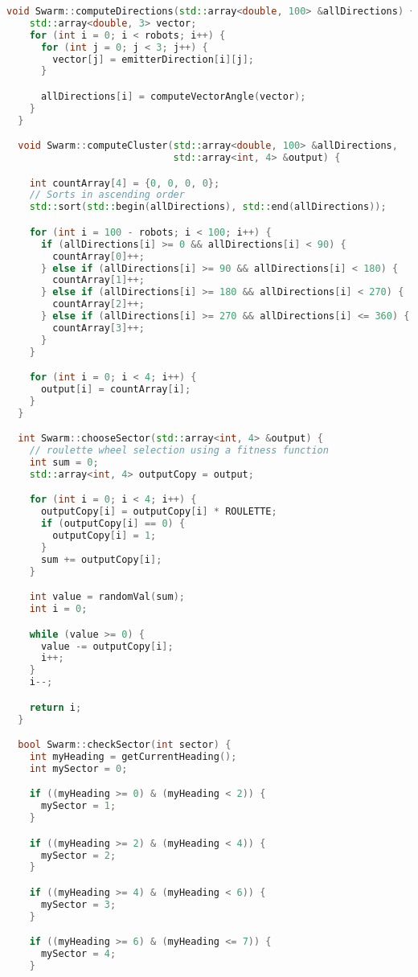 \begin{lstlisting}[language=C++, caption={swarm.cpp},label={lst:swarm-header}]
  void Swarm::computeDirections(std::array<double, 100> &allDirections) {
    std::array<double, 3> vector;
    for (int i = 0; i < robots; i++) {
      for (int j = 0; j < 3; j++) {
        vector[j] = emitterDirection[i][j];
      }

      allDirections[i] = computeVectorAngle(vector);
    }
  }

  void Swarm::computeCluster(std::array<double, 100> &allDirections,
                             std::array<int, 4> &output) {

    int countArray[4] = {0, 0, 0, 0};
    // Sorts in ascending order
    std::sort(std::begin(allDirections), std::end(allDirections));

    for (int i = 100 - robots; i < 100; i++) {
      if (allDirections[i] >= 0 && allDirections[i] < 90) {
        countArray[0]++;
      } else if (allDirections[i] >= 90 && allDirections[i] < 180) {
        countArray[1]++;
      } else if (allDirections[i] >= 180 && allDirections[i] < 270) {
        countArray[2]++;
      } else if (allDirections[i] >= 270 && allDirections[i] <= 360) {
        countArray[3]++;
      }
    }

    for (int i = 0; i < 4; i++) {
      output[i] = countArray[i];
    }
  }

  int Swarm::chooseSector(std::array<int, 4> &output) {
    // roulette wheel selection using a fitness function
    int sum = 0;
    std::array<int, 4> outputCopy = output;

    for (int i = 0; i < 4; i++) {
      outputCopy[i] = outputCopy[i] * ROULETTE;
      if (outputCopy[i] == 0) {
        outputCopy[i] = 1;
      }
      sum += outputCopy[i];
    }

    int value = randomVal(sum);
    int i = 0;

    while (value >= 0) {
      value -= outputCopy[i];
      i++;
    }
    i--;

    return i;
  }

  bool Swarm::checkSector(int sector) {
    int myHeading = getCurrentHeading();
    int mySector = 0;

    if ((myHeading >= 0) & (myHeading < 2)) {
      mySector = 1;
    }

    if ((myHeading >= 2) & (myHeading < 4)) {
      mySector = 2;
    }

    if ((myHeading >= 4) & (myHeading < 6)) {
      mySector = 3;
    }

    if ((myHeading >= 6) & (myHeading <= 7)) {
      mySector = 4;
    }


\end{lstlisting}
